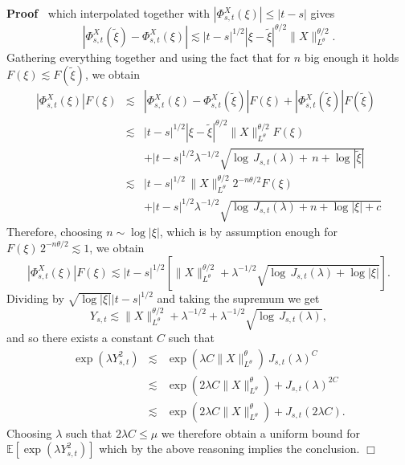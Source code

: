 \documentclass[10pt]{article}
\newenvironment{proof}{\noindent\textbf{Proof\ }}{\hspace*{\fill}$\Box$\medskip}
\begin{document}
\begin{proof}
  which interpolated together with $| \Phi^X_{s, t} (\xi) | \leqslant | t - s
  |$ gives
  \[ | \Phi_{s, t}^X (\tilde{\xi}) - \Phi_{s, t}^X (\xi) | \lesssim | t - s
     |^{1 / 2} | \xi - \tilde{\xi} |^{\theta / 2} \| X \|^{\theta /
     2}_{L^{\theta}} . \]
  Gathering everything together and using the fact that for $n$ big enough it
  holds $F (\xi) \lesssim F (\tilde{\xi})$, we obtain
  \begin{eqnarray*}
    | \Phi^X_{s, t} (\xi) | F (\xi) & \lesssim & | \Phi^X_{s, t} (\xi) -
    \Phi_{s, t}^X (\tilde{\xi}) | F (\xi) + | \Phi_{s, t}^X (\tilde{\xi}) | F
    (\tilde{\xi})\\
    & \lesssim & | t - s |^{1 / 2}  | \xi - \tilde{\xi} |^{\theta / 2}  \| X
    \|^{\theta / 2}_{L^{\theta}} F (\xi)\\
    &  & + | t - s |^{1 / 2} \lambda^{- 1 / 2}  \sqrt{\log \, J_{s, t}
    (\lambda) + \, n + \log | \tilde{\xi} |}\\
    & \lesssim & | t - s |^{1 / 2}  \, \| X \|^{\theta / 2}_{L^{\theta}} 2^{-
    n \theta / 2} F (\xi)\\
    &  & + | t - s |^{1 / 2} \lambda^{- 1 / 2}  \sqrt{\log \, J_{s, t}
    (\lambda) + n + \log | \xi | + c}
  \end{eqnarray*}
  Therefore, choosing $n \sim \log | \xi |$, which is by assumption enough for
  $F (\xi)  \, 2^{- n \theta / 2} \lesssim 1$, we obtain
  \[ | \Phi^X_{s, t} (\xi) | F (\xi) \lesssim | t - s |^{1 / 2} \left[ \| X
     \|^{\theta / 2}_{L^{\theta}} + \lambda^{- 1 / 2} \sqrt{\log \, J_{s, t}
     (\lambda) + \log | \xi |} \right] . \]
  Dividing by $\sqrt{\log | \xi |}  | t - s |^{1 / 2}$ and taking the supremum
  we get
  \[ Y_{s, t} \lesssim \| X \|^{\theta / 2}_{L^{\theta}} + \lambda^{- 1 / 2} +
     \lambda^{- 1 / 2} \sqrt{\log \, J_{s, t} (\lambda)}, \]
  and so there exists a constant $C$ such that
  \begin{eqnarray*}
    \exp (\lambda Y_{s, t}^2) & \lesssim & \exp (\lambda C \| X
    \|_{L^{\theta}}^{\theta})^{}  \, J_{s, t} (\lambda)^C\\
    & \lesssim & \exp (2 \lambda C \| X \|_{L^{\theta}}^{\theta}) + J_{s, t}
    (\lambda)^{2 C}\\
    & \lesssim & \exp (2 \lambda C \| X \|_{L^{\theta}}^{\theta}) + J_{s, t}
    (2 \lambda C) .
  \end{eqnarray*}
  Choosing $\lambda$ such that $2 \lambda C \leqslant \mu$ we therefore obtain
  a uniform bound for $\mathbb{E} [\exp (\lambda Y_{s, t}^2)]$ which by the
  above reasoning implies the conclusion.
\end{proof}
\end{document}
